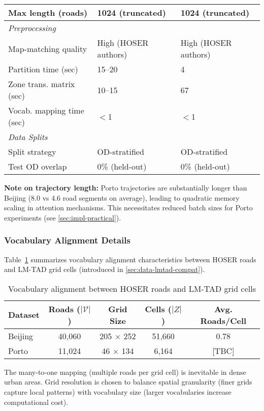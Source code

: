 \begin{table}[H]
\begin{tabular}{lll}
        \quad Max length (roads)        & 1024 (truncated)        & 1024 (truncated)      \\
        \midrule
        \multicolumn{3}{l}{\textit{Preprocessing}}                                   \\
        \quad Map-matching quality      & High (HOSER authors)    & High (HOSER authors)  \\
        \quad Partition time (sec)      & 15--20                  & 4                     \\
        \quad Zone trans. matrix (sec)  & 10--15                  & 67                    \\
        \quad Vocab. mapping time (sec) & $<$1                    & $<$1                  \\
        \midrule
        \multicolumn{3}{l}{\textit{Data Splits}}                                     \\
        \quad Split strategy            & OD-stratified           & OD-stratified         \\
        \quad Test OD overlap           & 0\% (held-out)          & 0\% (held-out)        \\
        \bottomrule
    \end{tabular}
\end{table}

\textbf{Note on trajectory length:} Porto trajectories are substantially longer than Beijing (8.0 vs 4.6 road segments on average), leading to quadratic memory scaling in attention mechanisms. This necessitates reduced batch sizes for Porto experiments (see \autoref{sec:impl-practical}).

\subsubsection{Vocabulary Alignment Details}
\label{app:vocab-stats}

Table~\ref{tab:vocab-alignment-appendix} summarizes vocabulary alignment characteristics between HOSER roads and LM-TAD grid cells (introduced in \autoref{sec:data-lmtad-compat}).

\begin{table}[H]
    \centering
    \caption{Vocabulary alignment between HOSER roads and LM-TAD grid cells}
    \label{tab:vocab-alignment-appendix}
    \begin{tabular}{lcccc}
        \toprule
        \textbf{Dataset} & \textbf{Roads ($|\mathcal{V}|$)} & \textbf{Grid Size} & \textbf{Cells ($|Z|$)} & \textbf{Avg. Roads/Cell} \\
        \midrule
        Beijing          & 40,060                           & 205 $\times$ 252   & 51,660                 & 0.78                     \\
        Porto            & 11,024                           & 46 $\times$ 134    & 6,164                  & [TBC]                    \\
        \bottomrule
    \end{tabular}
\end{table}

The many-to-one mapping (multiple roads per grid cell) is inevitable in dense urban areas. Grid resolution is chosen to balance spatial granularity (finer grids capture local patterns) with vocabulary size (larger vocabularies increase computational cost).
